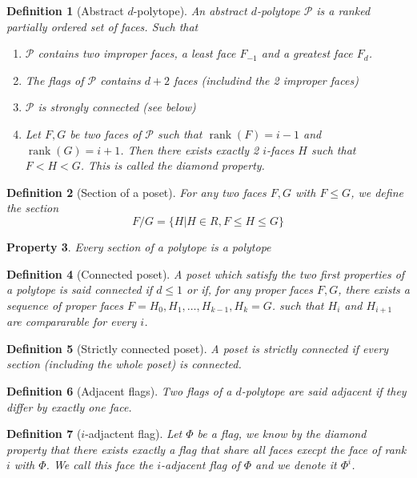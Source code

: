 \documentclass[a4paper]{article}
\theoremstyle{mytheorem}
\newtheorem{definition}{Definition}[section]
\newtheorem{property}[definition]{Property}
\DeclareMathOperator{\rank}{rank}
\begin{document}
\begin{definition}[Abstract $d$-polytope]
  An \textit{abstract $d$-polytope} $\mathcal P$ is a ranked partially ordered set of \textit{faces}. Such that
  \begin{enumerate}
    \item $\mathcal P$ contains two improper faces, a least face $F_{-1}$ and a greatest face $F_d$.
    \item The flags of $\mathcal P$ contains $d + 2$ faces (includind the 2 improper faces)
    \item $\mathcal P$ is strongly connected (see below)
    \item Let $F, G$ be two faces of $\mathcal P$ such that $\rank(F) = i - 1$ and $\rank(G) = i + 1$. Then there exists exactly 2 $i$-faces $H$ such that $F < H < G$. This is called the diamond property.
  \end{enumerate}
\end{definition}

\begin{definition}[Section of a poset]
  For any two faces $F, G$ with $F \le G$, we define the \textit{section} \[
    F/G = \{H | H \in R, F \le H \le G\}
  \]
\end{definition}

\begin{property}
  Every section of a polytope is a polytope
\end{property}

\begin{definition}[Connected poset]
  A poset which satisfy the two first properties of a polytope is said \textit{connected} if $d \le 1$ or if, for any proper faces $F, G$, there exists a sequence of proper faces $F = H_0, H_1, \dots, H_{k-1}, H_k = G$. such that $H_i$ and $H_{i+1}$ are compararable for every $i$.
\end{definition}

\begin{definition}[Strictly connected poset]
  A poset is \textit{strictly connected} if every section (including the whole poset) is connected.
\end{definition}

\begin{definition}[Adjacent flags]
  Two flags of a $d$-polytope are said adjacent if they differ by exactly one face.
\end{definition}

\begin{definition}[$i$-adjactent flag]
  Let $\Phi$ be a flag, we know by the diamond property that there exists exactly a flag that share all faces execpt the face of rank $i$ with $\Phi$. We call this face the $i$-adjacent flag of $\Phi$ and we denote it $\Phi^i$.
\end{definition}
\end{document}
